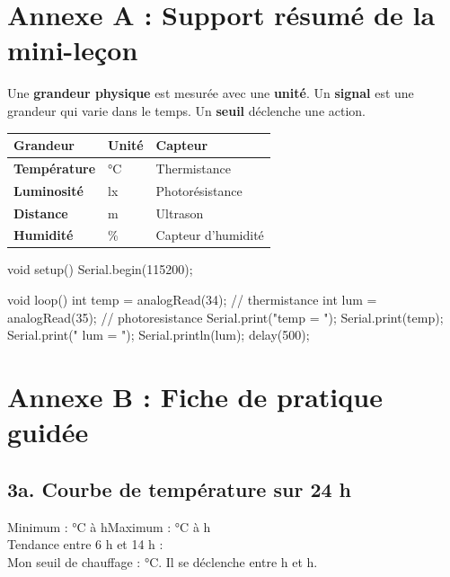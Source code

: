 \documentclass[11pt,a4paper]{article}
\begin{document}

\newpage
\section*{Annexe A : Support résumé de la mini-leçon}

\begin{tcolorbox}[colback=yellow!10,colframe=yellow!50!black]
Une \textbf{grandeur physique} est mesurée avec une \textbf{unité}. Un \textbf{signal} est une grandeur qui varie dans le temps. Un \textbf{seuil} déclenche une action.
\end{tcolorbox}

\begin{tabularx}{\linewidth}{>{\bfseries}p{3.2cm}Y Y}
\toprule
Grandeur & Unité & Capteur\\
\midrule
Température & °C & Thermistance\\
Luminosité & lx & Photorésistance\\
Distance & m & Ultrason\\
Humidité & \% & Capteur d'humidité\\
\bottomrule
\end{tabularx}

\begin{arduino}
void setup() {
  Serial.begin(115200);
}

void loop() {
  int temp = analogRead(34);    // thermistance
  int lum  = analogRead(35);    // photoresistance
  Serial.print("temp = ");
  Serial.print(temp);
  Serial.print("   lum = ");
  Serial.println(lum);
  delay(500);
}
\end{arduino}

\newpage
\section*{Annexe B : Fiche de pratique guidée}

\subsection*{3a. Courbe de température sur 24 h}
Minimum : \dotfill{} °C à \dotfill{} h\quad Maximum : \dotfill{} °C à \dotfill{} h\\
Tendance entre 6 h et 14 h : \dotfill\\
Mon seuil de chauffage : \dotfill{} °C. Il se déclenche entre \dotfill{} h et \dotfill{} h.
\end{document}
